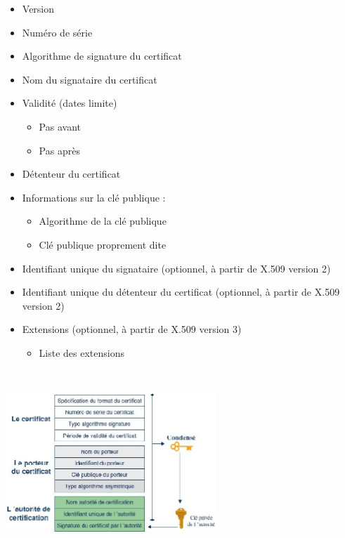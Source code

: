 \documentclass[a4paper,11pt,french]{article}
\begin{document}
\begin{minipage}{.4\linewidth}
\begin{itemize}
\item Version
\item Numéro de série
\item Algorithme de signature du certificat
\item Nom du signataire du certificat
\item Validité (dates limite) 
  \begin{itemize} 
  \item Pas avant
  \item Pas après
  \end{itemize}
\item Détenteur du certificat
\item Informations sur la clé publique :
  \begin{itemize}
  \item Algorithme de la clé publique
  \item Clé publique proprement dite
  \end{itemize}
\item Identifiant unique du signataire (optionnel, à partir de X.509 version 2)
\item Identifiant unique du détenteur du certificat (optionnel, à partir de X.509 version 2)
\item Extensions (optionnel, à partir de X.509 version 3)
  \begin{itemize}
  \item Liste des extensions
  \end{itemize}
\end{itemize}
\end{minipage}\hfill
\begin{minipage}{.4\linewidth}
\includegraphics[width=8cm, height=7cm]{./pics/cert.jpg}
\end{minipage}
\end{document}

